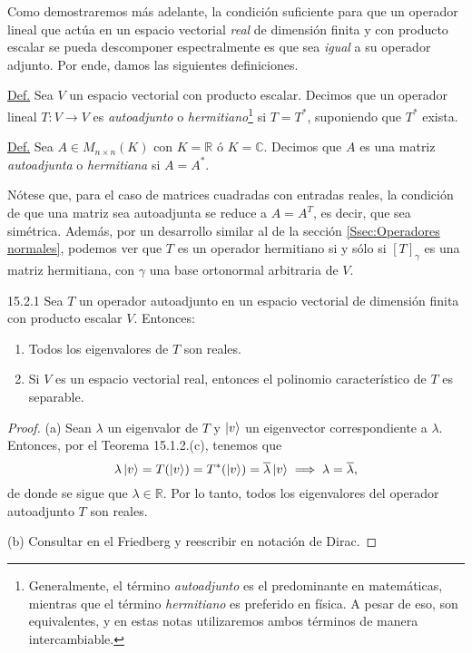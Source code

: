 \documentclass[12pt,libertine]{book}
\begin{document}
Como demostraremos más adelante, la condición suficiente para que un operador lineal que actúa en un espacio vectorial \emph{real} de dimensión finita y con producto escalar se pueda descomponer espectralmente es que sea \emph{igual} a su operador adjunto. Por ende, damos las siguientes definiciones.

\begin{tcolorbox}
    \underline{Def.} Sea $V$ un espacio vectorial con producto escalar. Decimos que un operador lineal $T:V\to V$ es \emph{autoadjunto} o \emph{hermitiano}\footnote{Generalmente, el término \emph{autoadjunto} es el predominante en matemáticas, mientras que el término \emph{hermitiano} es preferido en física. A pesar de eso, son equivalentes, y en estas notas utilizaremos ambos términos de manera intercambiable.} si $T=T^*$, suponiendo que $T^*$ exista.

    \vspace{3mm}
    \underline{Def.} Sea $A\in M_{n\times n}(K)$ con $K=\mathbb{R}$ ó $K=\mathbb{C}$. Decimos que $A$ es una matriz \emph{autoadjunta} o \emph{hermitiana} si $A=A^*$.
\end{tcolorbox}

Nótese que, para el caso de matrices cuadradas con entradas reales, la condición de que una matriz sea autoadjunta se reduce a $A=A^T$, es decir, que sea simétrica. Además, por un desarrollo similar al de la sección \ref{Ssec:Operadores normales}, podemos ver que $T$ es un operador hermitiano si y sólo si $[T]_\gamma$ es una matriz hermitiana, con $\gamma$ una base ortonormal arbitraria de $V$.

\begin{Lema} {15.2.1}
    Sea $T$ un operador autoadjunto en un espacio vectorial de dimensión finita con producto escalar $V$. Entonces:
    \begin{enumerate}[label=(\alph*)]
        \item Todos los eigenvalores de $T$ son reales.
        \item Si $V$ es un espacio vectorial real, entonces el polinomio característico de $T$ es separable.
    \end{enumerate}

    \begin{proof}
        (a) Sean $\lambda$ un eigenvalor de $T$ y $\ket{v}$ un eigenvector correspondiente a $\lambda$. Entonces, por el Teorema 15.1.2.(c), tenemos que \[
            \lambda \ket{v} = T(\ket{v}) = T^*(\ket{v}) = \overline{\lambda} \ket{v} \implies \lambda = \overline{\lambda},
        \] de donde se sigue que $\lambda\in\mathbb{R}$. Por lo tanto, todos los eigenvalores del operador autoadjunto $T$ son reales.

        \vspace{3mm}
        (b) Consultar en el Friedberg y reescribir en notación de Dirac.
    \end{proof}
\end{Lema}
\end{document}

